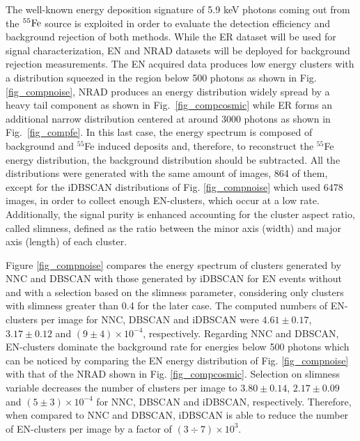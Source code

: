\documentclass[a4paper,11pt]{article}
\begin{document}
The well-known energy deposition signature of 5.9 keV photons coming out from the $\rm ^{55}Fe$ source is exploited in order to evaluate the detection efficiency and background rejection of both methods. While the ER dataset will be used for signal characterization, EN and NRAD datasets will be deployed for background rejection measurements.
The EN acquired data produces low energy clusters with a distribution squeezed in the region below 500 photons as shown in Fig. \ref{fig_compnoise}, NRAD produces an energy distribution widely spread by a heavy tail component as shown in Fig.~\ref{fig_compcosmic} while ER forms an additional narrow distribution centered at around 3000 photons as shown in Fig.~\ref{fig_compfe}.
In this last case, the energy spectrum is composed of background and $^{55}$Fe induced deposits and, therefore, to reconstruct the $^{55}$Fe energy distribution, the background distribution should be subtracted. All the distributions were generated with the same amount of images, 864 of them, except for the iDBSCAN distributions of Fig. \ref{fig_compnoise} which used 6478 images, in order to collect enough EN-clusters, which occur at a low rate.  
Additionally, the signal purity is enhanced accounting for the cluster aspect ratio, called slimness, defined as the ratio between the minor axis (width) and major axis (length) of each cluster.

Figure \ref{fig_compnoise} compares the energy spectrum of clusters generated by NNC and DBSCAN with those generated by iDBSCAN for EN events without and with a selection based on the slimness parameter, considering only clusters with slimness greater than 0.4 for the later case. The computed numbers of EN-clusters per image for NNC, DBSCAN and iDBSCAN were $4.61 \pm 0.17$, $3.17 \pm 0.12$ and $(9 \pm 4)\times10^{-4}$, respectively.
Regarding NNC and DBSCAN, EN-clusters dominate the background rate for energies below 500 photons which can be noticed by comparing the EN energy distribution of Fig. \ref{fig_compnoise} with that of the NRAD shown in Fig. \ref{fig_compcosmic}. Selection on slimness variable decreases the number of clusters per image to $3.80 \pm 0.14$, $2.17 \pm 0.09$ and $(5 \pm 3)\times 10^{-4}$ for NNC, DBSCAN and iDBSCAN, respectively. Therefore, when compared to NNC and DBSCAN, iDBSCAN is able to reduce the number of EN-clusters per image by a factor of $(3\div7)\times 10^3$.
\end{document}
